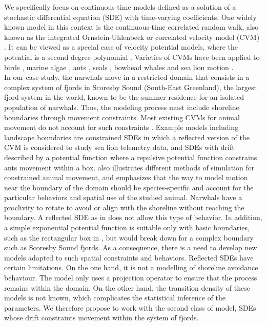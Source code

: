 \documentclass[aoas]{imsart}
\theoremstyle{definition}
\theoremstyle{remark}
\theoremstyle{remark}
\newcommand {\1}{\mathbb{1}}
\begin{document}
We specifically focus on continuous-time models defined as a solution of a stochastic differential equation (SDE) with time-varying coefficients. One widely known model in this context is the continuous-time correlated random walk, also known as the integrated Ornstein-Uhlenbeck or correlated velocity model (CVM) \citep{johnson_continuous_2008}. It can be viewed as a special case of velocity potential models, where the potential is a second degree polynomial \citep{preisler_analyzing_2013}.  Varieties of CVMs have been applied to birds \citep{janaswamy_state_2018}, marine algae \citep{gurarie_estimating_2011}, ants \citep{russell_spatially_2018}, seals \citep{johnson_continuous_2008,albertsen_generalizing_2018}, bowhead whales \citep{gurarie_estimating_2011} and sea lion motion \citep{hanks_reflected_2017}.\\

In our case study, the narwhals move in a restricted domain that consists in a complex system of fjords in Scoresby Sound (South-East Greenland), the largest fjord system in the world, known to be the summer residence for an isolated population of narwhals. Thus, the modeling process must include shoreline boundaries through movement constraints. Most existing CVMs for animal movement do not account for such constraints \citep{johnson_continuous_2008,michelot_varying-coefficient_2021,gurarie_correlated_2017}.
Example models including landscape boundaries are constrained SDEs  \citep{hanks_reflected_2017} in which a reflected version of the CVM is considered to study sea lion telemetry data, and SDEs with drift described by a potential function \citep{russell_spatially_2018} where a repulsive potential function  constrains ants movement within a box. \citep{brillinger_simulating_2003} also illustrates different methods of simulation for constrained animal movement, and emphasizes that the way to model motion near the boundary of the domain should be species-specific and account for the particular behaviors and spatial use of the studied animal. Narwhals have a proclivity to rotate to avoid or align with the shoreline without reaching the boundary. A reflected SDE as in \citep{hanks_reflected_2017} does not allow this type of behavior. In addition, a simple exponential potential function is suitable only with basic boundaries, such as the rectangular box in \citep{russell_spatially_2018}, but would break down for a complex boundary such as Scoresby Sound fjords. As a consequence, there is a need to develop new models adapted to such spatial constraints and behaviors. Reflected SDEs have certain limitations. On the one hand, it is not a modelling of shoreline avoidance behaviour. The model only uses a projection operator to ensure that the process remains within the domain. On the other hand, the transition density of these models is not known, which complicates the statistical inference of the parameters. We therefore propose to work with the second class of model, SDEs whose drift constraints movement within the system of fjords. \\
\end{document}
